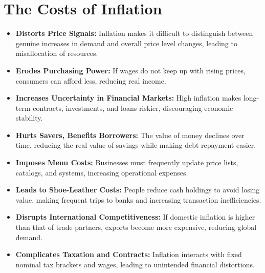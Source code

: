 \documentclass[a4paper, 11pt]{article}
\begin{document}
\section{The Costs of Inflation}
\begin{itemize}
    \item \textbf{Distorts Price Signals:} Inflation makes it difficult to distinguish between genuine increases in demand and overall price level changes, leading to misallocation of resources.
    \item \textbf{Erodes Purchasing Power:} If wages do not keep up with rising prices, consumers can afford less, reducing real income.
    \item \textbf{Increases Uncertainty in Financial Markets:} High inflation makes long-term contracts, investments, and loans riskier, discouraging economic stability.
    \item \textbf{Hurts Savers, Benefits Borrowers:} The value of money declines over time, reducing the real value of savings while making debt repayment easier.
    \item \textbf{Imposes Menu Costs:} Businesses must frequently update price lists, catalogs, and systems, increasing operational expenses.
    \item \textbf{Leads to Shoe-Leather Costs:} People reduce cash holdings to avoid losing value, making frequent trips to banks and increasing transaction inefficiencies.
    \item \textbf{Disrupts International Competitiveness:} If domestic inflation is higher than that of trade partners, exports become more expensive, reducing global demand.
    \item \textbf{Complicates Taxation and Contracts:} Inflation interacts with fixed nominal tax brackets and wages, leading to unintended financial distortions.
\end{itemize}
\end{document}
